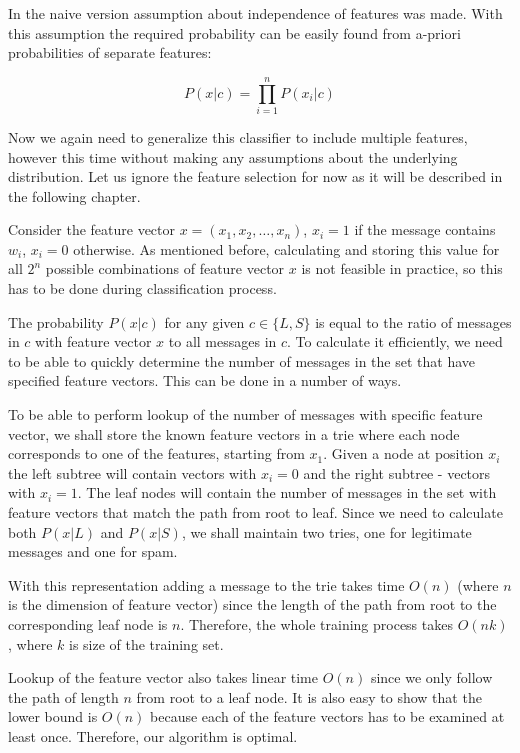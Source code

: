 \documentclass[12pt]{report}
\makeatletter
\renewcommand{\subsection}{\@startsection{subsection}{2}{0mm}{-\baselineskip}{-5pt}{\bf}}
\makeatother
\begin{document}
In the naive version assumption about independence of features was made. With this assumption the required probability can be easily found from a-priori probabilities of separate features:

$$P(x | c) = \prod_{i=1}^{n}P(x_i | c)$$

Now we again need to generalize this classifier to include multiple features, however this time without making any assumptions about the underlying distribution. Let us ignore the feature selection for now as it will be described in the following chapter.

Consider the feature vector $x = (x_1, x_2, \dots, x_n)$, $x_i = 1$ if the message contains $w_i$, $x_i = 0$ otherwise. As mentioned before, calculating and storing this value for all $2^n$ possible combinations of feature vector $x$ is not feasible in practice, so this has to be done during classification process.

The probability $P(x | c)$ for any given $c \in \{L, S\}$ is equal to the ratio of messages in $c$ with feature vector $x$ to all messages in $c$. To calculate it efficiently, we need to be able to quickly determine the number of messages in the set that have specified feature vectors. This can be done in a number of ways.

\subsection{Feature Trie}

To be able to perform lookup of the number of messages with specific feature vector, we shall store the known feature vectors in a trie where each node corresponds to one of the features, starting from $x_1$. Given a node at position $x_i$ the left subtree will contain vectors with $x_i = 0$ and the right subtree - vectors with $x_i = 1$. The leaf nodes will contain the number of messages in the set with feature vectors that match the path from root to leaf. Since we need to calculate both $P(x | L)$ and $P(x | S)$, we shall maintain two tries, one for legitimate messages and one for spam.

With this representation adding a message to the trie takes time $O(n)$ (where $n$ is the dimension of feature vector) since the length of the path from root to the corresponding leaf node is $n$. Therefore, the whole training process takes $O(nk)$, where $k$ is size of the training set.

Lookup of the feature vector also takes linear time $O(n)$ since we only follow the path of length $n$ from root to a leaf node. It is also easy to show that the lower bound is $O(n)$ because each of the feature vectors has to be examined at least once. Therefore, our algorithm is optimal.
\end{document}
